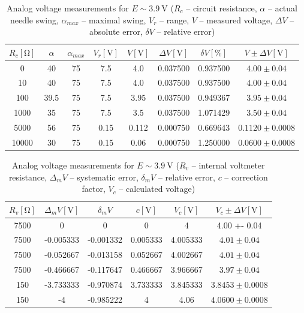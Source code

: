 \begin{table}[H]
	\centering
	\begin{tabular}{ c | c | c | c | c | c | c | c}
		$R_c [\unit{\ohm}]$ & $\alpha$ & $\alpha_{max}$  & $V_r [\unit{\volt}]$ & $V [\unit{\volt}]$ & $\Delta V [\unit{\volt}]$ & $\delta V  [\unit{\percent}]$ & $V \pm \Delta V [\unit{\volt}]$\\
		\hline
		0 & 40 & 75 & 7.5 & 4.0 & 0.037500 & 0.937500 & $4.00 \pm 0.04$\\
		\hline
		10 & 40 & 75 & 7.5 & 4.0 & 0.037500 & 0.937500 & $4.00 \pm 0.04$\\
		\hline
		100 & 39.5 & 75 & 7.5 & 3.95 & 0.037500 & 0.949367 & $3.95 \pm 0.04$\\
		\hline
		1000 & 35 & 75 & 7.5 & 3.5 & 0.037500 & 1.071429 & $3.50 \pm 0.04$\\
		\hline
		5000 & 56 & 75 & 0.15 & 0.112 & 0.000750 & 0.669643 & $0.1120 \pm 0.0008$\\
		\hline
		10000 & 30 & 75 & 0.15 & 0.06 & 0.000750 & 1.250000 & $0.0600 \pm 0.0008$
	\end{tabular}
	\caption{Analog voltage measurements for $E \sim \SI{3.9}{\volt}$ ($R_c$ -- circuit resistance, $\alpha$ -- actual needle swing, $\alpha_{max}$ -- maximal swing, $V_r$ -- range, $V$ -- measured voltage, $\Delta V$ -- absolute error, $\delta V$ -- relative error)}
	\label{tab:analog_volt_1}
\end{table}

\begin{table}[H]
	\centering
	\begin{tabular}{ c | c | c | c | c | c}
		$R_v [\unit{\ohm}]$  & $\Delta_m V [\unit{\volt}]$ & $\delta_m V $ & $c [\unit{\volt}]$ & $V_c [\unit{\volt}]$ & $V_c \pm \Delta V [\unit{\volt}]$\\
		\hline
		7500 & 0 & 0 & 0 & 4 & 4.00 +- 0.04\\
		\hline
		7500 & -0.005333 & -0.001332 & 0.005333 & 4.005333 & $4.01 \pm  0.04$\\
		\hline
		7500 & -0.052667 & -0.013158 & 0.052667 & 4.002667 & $4.01 \pm 0.04$\\
		\hline
		7500 & -0.466667 & -0.117647 & 0.466667 & 3.966667 & $3.97 \pm 0.04$\\
		\hline
		150 & -3.733333 & -0.970874 & 3.733333 & 3.845333 & $3.8453 \pm 0.0008$\\
		\hline
		150 & -4 & -0.985222 & 4 & 4.06 & $4.0600 \pm 0.0008$
	\end{tabular}
	\caption{Analog voltage measurements for $E \sim \SI{3.9}{\volt}$ ($R_v$ -- internal voltmeter resistance, $\Delta_m V$ -- systematic error, $\delta_m V$ -- relative error, $c$ -- correction factor, $V_c$ -- calculated voltage)}
	\label{tab:analog_volt_2}
\end{table}

